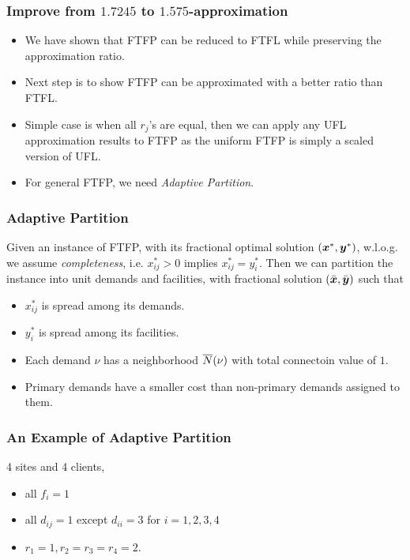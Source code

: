 \documentclass[hyperref, xcolor=dvipsnames]{beamer}
\begin{document}
\begin{frame}
  \frametitle{Improve from $1.7245$ to $1.575$-approximation}
  \begin{itemize}
  \item We have shown that FTFP can be reduced to FTFL while
    preserving the approximation ratio.
  \item Next step is to show FTFP can be approximated with a better
    ratio than FTFL.
  \item Simple case is when all $r_j$'s are equal, then we can apply
    any UFL approximation results to FTFP as the uniform FTFP is
    simply a scaled version of UFL.
  \item For general FTFP, we need \emph{Adaptive Partition}.
  \end{itemize}
\end{frame}

\begin{frame}
  \frametitle{Adaptive Partition} 

  Given an instance of FTFP, with its fractional optimal solution
  $(\boldsymbol{x}^\ast, \boldsymbol{y}^\ast)$, w.l.o.g. we assume \emph{completeness},
  i.e. $x_{ij}^\ast > 0$ implies $x_{ij} ^\ast = y_i^\ast$.  Then we
  can partition the instance into unit demands and facilities, with
  fractional solution $(\bar{\boldsymbol{x}}, \bar{\boldsymbol{y}})$ such that
  \begin{itemize}
  \item $x_{ij}^\ast$ is spread among its demands.
  \item $y_i^\ast$ is spread among its facilities.
  \item Each demand $\nu$ has a neighborhood ${\overline{N}}(\nu)$ with total
    connectoin value of $1$.
  \item Primary demands have a smaller cost than non-primary demands
    assigned to them.
  \end{itemize}
\end{frame}

\begin{frame}
  \frametitle{An Example of Adaptive Partition}
  4 sites and 4 clients,
  \begin{itemize}
  \item all $f_i=1$
  \item all $d_{ij}=1$ except $d_{ii} = 3$ for $i=1,2,3,4$
  \item $r_1 = 1, r_2 = r_3 = r_4 = 2$.
  \end{itemize}
\end{frame}
\end{document}
